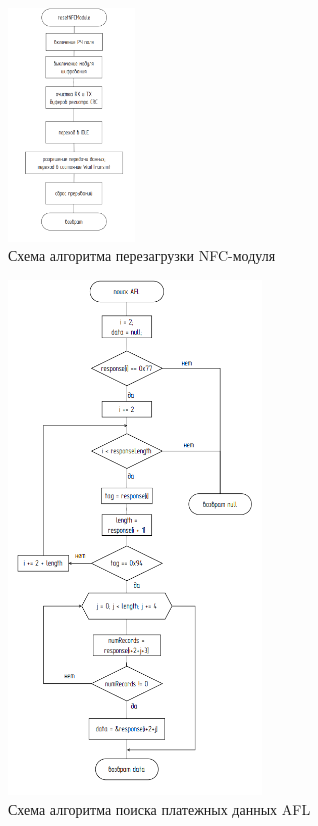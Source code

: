 \begin{figure}[H]
    \centering
    \includegraphics[width=0.3\textwidth]{images/design/restart_pn5180}
    \caption{\centering Схема алгоритма перезагрузки NFC-модуля}
    \label{fig:restart_pn5180}
\end{figure}

\begin{figure}[H]
    \centering
    \includegraphics[width=0.6\textwidth]{images/design/find_afl}
    \caption{\centering Схема алгоритма поиска платежных данных AFL}
    \label{fig:find_afl}
\end{figure}


